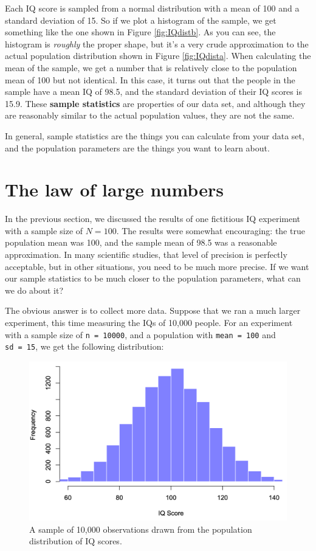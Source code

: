 \documentclass[
  11pt,
  a4paper,
  twoside,symmetric,openright]{book}
\theoremstyle{break}
\theoremstyle{break}
\begin{document}
Each IQ score is sampled from a normal distribution with a mean of 100 and a standard deviation of 15. So if we plot a histogram of the sample, we get something like the one shown in Figure \ref{fig:IQdistb}. As you can see, the histogram is \emph{roughly} the proper shape, but it's a very crude approximation to the actual population distribution shown in Figure \ref{fig:IQdista}. When calculating the mean of the sample, we get a number that is relatively close to the population mean of 100 but not identical. In this case, it turns out that the people in the sample have a mean IQ of 98.5, and the standard deviation of their IQ scores is 15.9. These \textbf{sample statistics} are properties of our data set, and although they are reasonably similar to the actual population values, they are not the same.

In general, sample statistics are the things you can calculate from your data set, and the population parameters are the things you want to learn about.

\section{The law of large numbers}\label{lawlargenumbers}

In the previous section, we discussed the results of one fictitious IQ experiment with a sample size of \(N=100\). The results were somewhat encouraging: the true population mean was 100, and the sample mean of 98.5 was a reasonable approximation. In many scientific studies, that level of precision is perfectly acceptable, but in other situations, you need to be much more precise. If we want our sample statistics to be much closer to the population parameters, what can we do about it?

The obvious answer is to collect more data. Suppose that we ran a much larger experiment, this time measuring the IQs of 10,000 people. For an experiment with a sample size of \texttt{n\ =\ 10000}, and a population with \texttt{mean\ =\ 100} and \texttt{sd\ =\ 15}, we get the following distribution:

\begin{figure}

{\centering \includegraphics[width=0.6\linewidth]{resources/image/IQdistc} 

}

\caption{A sample of 10,000 observations drawn from the population distribution of IQ scores.}\label{fig:IQdistc}
\end{figure}
\end{document}
